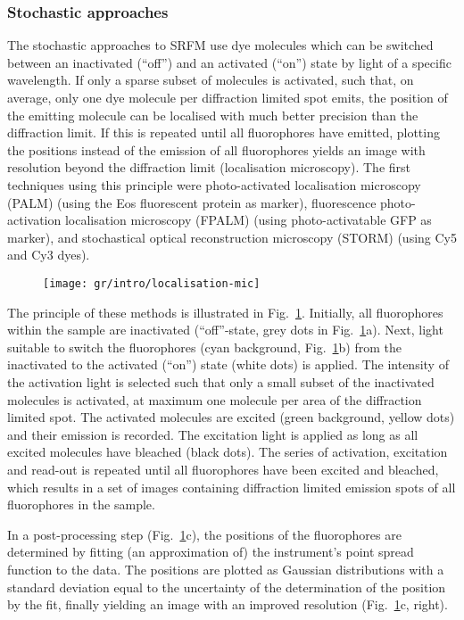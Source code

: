 \subsubsection{Stochastic approaches}
\label{sec:smlm}
The stochastic approaches to SRFM use dye molecules which can be switched
between an inactivated (``off'') and an activated (``on'') state by light of a
specific wavelength. If only a sparse subset of molecules is activated, such
that, on average, only one dye molecule per diffraction limited spot emits,
the position of the emitting molecule can be localised with much better
precision than the diffraction limit. If this is repeated until all
fluorophores have emitted, plotting the positions instead of the emission of
all fluorophores yields an image with resolution beyond the diffraction
limit (localisation microscopy). The first techniques using this principle
were photo-activated localisation microscopy (PALM) \cite{Betzig2006} (using
the Eos fluorescent protein \cite{Wiedenmann2004} as marker), fluorescence
photo-activation localisation microscopy (FPALM) \cite{Hess2006} (using
photo-activatable GFP as marker), and stochastical
optical reconstruction microscopy (STORM) \cite{Rust2006} (using Cy5 and Cy3
dyes).

\begin{figure}
  \centering
  \texttt{[image: gr/intro/localisation-mic]}
  \caption{}
  \label{fig:lm}
\end{figure}

The principle of these methods is illustrated in
Fig.~\ref{fig:lm}. Initially, all fluorophores within the sample are
inactivated (``off''-state, grey dots in Fig.~\ref{fig:lm}a). Next,  light suitable to switch the fluorophores
(cyan background, Fig.~\ref{fig:lm}b) from the inactivated to
the activated (``on'') state (white dots) is applied. The intensity of the
activation light is selected such that only a small subset of the inactivated
molecules is activated, at maximum one molecule per area of the diffraction limited spot. The activated molecules are excited
(green background, yellow dots) and their emission is recorded. The excitation
light is applied as long as all excited molecules have bleached (black
dots). The series of activation, excitation and read-out is repeated until all
fluorophores have been excited and bleached, which results in a set of images
containing diffraction limited emission spots of all fluorophores in the
sample.

In a post-processing step (Fig.~\ref{fig:lm}c), the positions of the
fluorophores are determined by fitting (an approximation of) the instrument's
point spread function to the data. The positions are plotted as Gaussian
distributions with a standard deviation equal to the uncertainty of the
determination of the position by the fit, finally yielding an image with an
improved resolution (Fig.~\ref{fig:lm}c, right).

